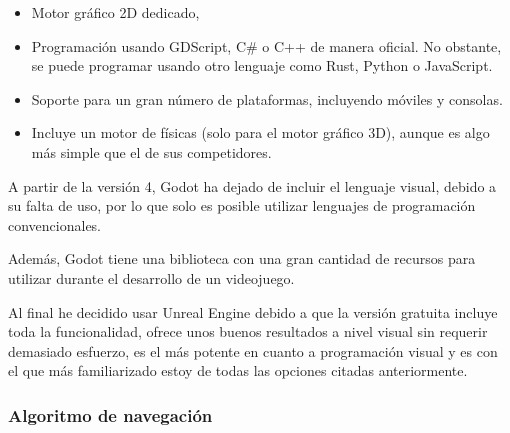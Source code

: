 \documentclass[a4paper,11pt]{book}
\begin{document}
\begin{itemize}
   \item Motor gráfico 2D dedicado, 
   \item Programación usando GDScript, C\# o C++ de manera oficial. No obstante, se puede programar usando otro lenguaje como Rust, Python o JavaScript. 
   \item Soporte para un gran número de plataformas, incluyendo móviles y consolas.
   \item Incluye un motor de físicas (solo para el motor gráfico 3D), aunque es algo más simple que el de sus competidores.
\end{itemize}

\bigskip 

A partir de la versión 4, Godot ha dejado de incluir el lenguaje visual, debido a su falta de uso, por lo que solo es posible utilizar lenguajes de programación convencionales. %

\bigskip

Además, Godot tiene una biblioteca con una gran cantidad de recursos para utilizar durante el desarrollo de un videojuego.

\bigskip

Al final he decidido usar Unreal Engine debido a que la versión gratuita incluye toda la funcionalidad, ofrece unos buenos resultados a nivel visual sin requerir demasiado esfuerzo, es el más potente en cuanto a programación visual y es con el que más familiarizado estoy de todas las opciones citadas anteriormente.

\subsection{Algoritmo de navegación}
%
%
%
%
%
%
%
%
%
%
%
%
%
%
%
%
%
%
%
%
%
%
\chapter*{}
\thispagestyle{empty}
\end{document}
